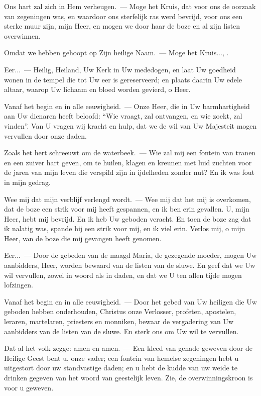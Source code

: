 \documentclass[12pt,twoside,a5paper]{article}
\begin{document}
\begin{halfparskip}
   Ons hart zal zich in Hem verheugen.~--- Moge het Kruis, dat voor ons de oorzaak van zegeningen was, en waardoor ons sterfelijk ras werd bevrijd, voor ons een sterke muur zijn, mijn Heer, en mogen we door haar de boze en al zijn listen overwinnen.

  Omdat we hebben gehoopt op Zijn heilige Naam.~--- Moge het Kruis..., .

  Eer...~--- Heilig, Heiland, Uw Kerk in Uw mededogen, en laat Uw goedheid wonen in de tempel die tot Uw eer is gereserveerd; en plaats daarin Uw edele altaar, waarop Uw lichaam en bloed worden gevierd, o Heer.

  Vanaf het begin en in alle eeuwigheid.~--- Onze Heer, die in Uw barmhartigheid aan Uw dienaren heeft beloofd: ``Wie vraagt, zal ontvangen, en wie zoekt, zal vinden''. Van U vragen wij kracht en hulp, dat we de wil van Uw Majesteit mogen vervullen door onze daden.
\end{halfparskip}

\begin{halfparskip}
   Zoals het hert schreeuwt om de waterbeek.~--- Wie zal mij een fontein van tranen en een zuiver hart geven, om te huilen, klagen en kreunen met luid zuchten voor de jaren van mijn leven die verspild zijn in ijdelheden zonder nut? En ik was fout in mijn gedrag.

  Wee mij dat mijn verblijf verlengd wordt.~--- Wee mij dat het mij is overkomen, dat de boze een strik voor mij heeft gespannen, en ik ben erin gevallen. U, mijn Heer, hebt mij bevrijd. En ik heb Uw geboden veracht. En toen de boze zag dat ik nalatig was, spande hij een strik voor mij, en ik viel erin. Verlos mij, o mijn Heer, van
  de boze die mij gevangen heeft genomen.

  Eer...~--- Door de gebeden van de maagd Maria, de gezegende moeder, mogen Uw aanbidders, Heer, worden bewaard van de listen van de sluwe. En geef dat we Uw wil vervullen, zowel in woord als in daden, en dat we U ten allen tijde mogen lofzingen.

  Vanaf het begin en in alle eeuwigheid.~--- Door het gebed van Uw heiligen die Uw geboden hebben
  onderhouden, Christus onze Verlosser, profeten, apostelen, leraren, martelaren, priesters en monniken, bewaar de vergadering van Uw aanbidders van de listen van de sluwe. En sterk ons om Uw wil te vervullen.

  Dat al het volk zegge: amen en amen.~--- Een kleed van genade geweven door de Heilige Geest bent u, onze vader; een fontein van hemelse zegeningen hebt u uitgestort door uw standvastige daden; en u hebt de kudde van uw weide te drinken gegeven van het woord van geestelijk leven. Zie, de overwinningskroon is voor u geweven.
\end{halfparskip}
\end{document}
